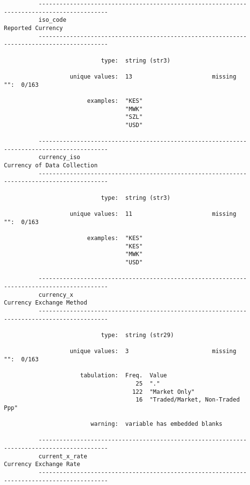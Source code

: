 \documentclass{article}
\begin{document}
\begin{verbatim}
          ------------------------------------------------------------------------------------------
          iso_code                                                                 Reported Currency
          ------------------------------------------------------------------------------------------
          
                            type:  string (str3)
          
                   unique values:  13                       missing "":  0/163
          
                        examples:  "KES"
                                   "MWK"
                                   "SZL"
                                   "USD"
          
          ------------------------------------------------------------------------------------------
          currency_iso                                                   Currency of Data Collection
          ------------------------------------------------------------------------------------------
          
                            type:  string (str3)
          
                   unique values:  11                       missing "":  0/163
          
                        examples:  "KES"
                                   "KES"
                                   "MWK"
                                   "USD"
          
          ------------------------------------------------------------------------------------------
          currency_x                                                        Currency Exchange Method
          ------------------------------------------------------------------------------------------
          
                            type:  string (str29)
          
                   unique values:  3                        missing "":  0/163
          
                      tabulation:  Freq.  Value
                                      25  "."
                                     122  "Market Only"
                                      16  "Traded/Market, Non-Traded Ppp"
          
                         warning:  variable has embedded blanks
          
          ------------------------------------------------------------------------------------------
          current_x_rate                                                      Currency Exchange Rate
          ------------------------------------------------------------------------------------------
          

\end{verbatim}
\end{document}

